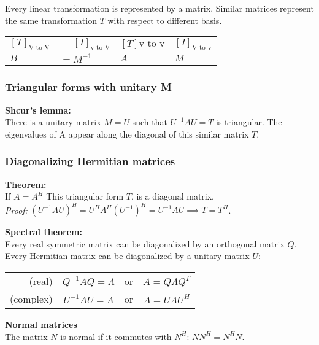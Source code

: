 Every linear transformation is represented by a matrix. Similar matrices represent the same transformation $T$ with respect to different basis.\\
\begin{tabularx}{\linewidth}{lllX}
$[T]_{\text{V to V}}$ 	& $= [I]_{\text{v to V}}$ & $[T]{\text{v to v}}$ & $[I]_{\text{V to v}}$\\
$B$ & $=M^{-1}$ & $A$ & $M$
\end{tabularx}

\subsubsection{Triangular forms with unitary M}

\textbf{Shcur's lemma:}\\
There is a unitary matrix $M = U$ such that $U^{-1}AU = T$ is triangular. The eigenvalues of A appear along the diagonal of this similar matrix $T$.


\subsubsection{Diagonalizing Hermitian matrices}

\textbf{Theorem:}\\
If $A = A^H$ This triangular form $T$, is a diagonal matrix.\\
\textit{Proof:} $(U^{-1}AU)^H = U^HA^H(U^{-1})^H = U^{-1}AU \implies T = T^H$.

\vspace{6pt}

\textbf{Spectral theorem:}\\
Every real symmetric matrix can be diagonalized by an orthogonal matrix $Q$. Every Hermitian matrix can be diagonalized by a unitary matrix $U$:\\
\begin{center}
\begin{tabular}{rccc}
(real) & $Q^{-1}AQ = \Lambda$ & or & $A = Q\Lambda Q^T$\\
(complex) & $U^{-1}AU = \Lambda$ & or & $A = U\Lambda U^H$
\end{tabular}
\end{center}

\vspace{6pt}

\textbf{Normal matrices} \\
The matrix $N$ is normal if it commutes with $N^H$: $NN^H = N^HN$.


